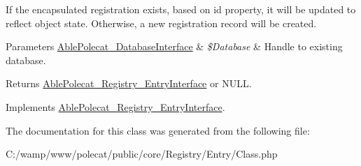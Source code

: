 If the encapsulated registration exists, based on id property, it will be updated to reflect object state. Otherwise, a new registration record will be created.


\begin{DoxyParams}[1]{Parameters}
\hyperlink{interface_able_polecat___database_interface}{Able\+Polecat\+\_\+\+Database\+Interface} & {\em \$\+Database} & Handle to existing database.\\
\hline
\end{DoxyParams}
\begin{DoxyReturn}{Returns}
\hyperlink{interface_able_polecat___registry___entry_interface}{Able\+Polecat\+\_\+\+Registry\+\_\+\+Entry\+Interface} or N\+U\+L\+L. 
\end{DoxyReturn}


Implements \hyperlink{interface_able_polecat___registry___entry_interface_a999eef977eb899167ae02f83dd26a4ae}{Able\+Polecat\+\_\+\+Registry\+\_\+\+Entry\+Interface}.



The documentation for this class was generated from the following file\+:\begin{DoxyCompactItemize}
\item 
C\+:/wamp/www/polecat/public/core/\+Registry/\+Entry/Class.\+php\end{DoxyCompactItemize}
